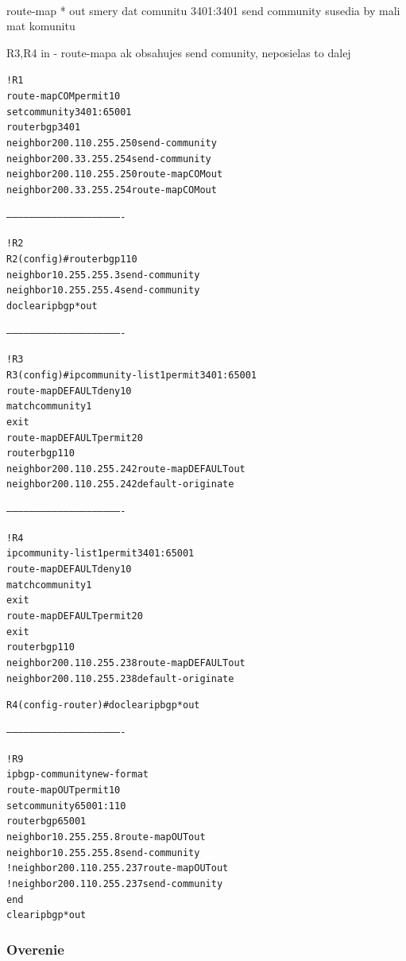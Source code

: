 \documentclass[12pt,twoside,a4paper]{report}
\begin{document}
\paragraph{}
route-map
* out smery dat comunitu 3401:3401
send community
susedia by mali mat komunitu

R3,R4 in - route-mapa
ak obsahujes send comunity, neposielas to dalej

\noindent
{\selectfont
\begin{small}
\begin{alltt}
!R1
route-map COM permit 10
  set community 3401:65001
router bgp 3401
neighbor 200.110.255.250 send-community
neighbor 200.33.255.254 send-community
  neighbor 200.110.255.250 route-map COM out
  neighbor 200.33.255.254 route-map COM out


-------------------------------------------------------------


!R2
R2(config)#router bgp 110
  neighbor 10.255.255.3 send-community
  neighbor 10.255.255.4 send-community
do clear ip bgp * out


-------------------------------------------------------------


!R3
R3(config)#ip community-list 1 permit 3401:65001
route-map DEFAULT deny 10
  match community 1
  exit
route-map DEFAULT permit 20
router bgp 110
  neighbor 200.110.255.242 route-map DEFAULT out
  neighbor 200.110.255.242 default-originate


-------------------------------------------------------------


!R4
ip community-list 1 permit 3401:65001
route-map DEFAULT deny 10
  match community 1
  exit
route-map DEFAULT permit 20
exit
router bgp 110
  neighbor 200.110.255.238 route-map DEFAULT out
  neighbor 200.110.255.238 default-originate

R4(config-router)#do clear ip bgp * out


-------------------------------------------------------------


!R9
ip bgp-community new-format
route-map OUT permit 10
set community 65001:110
router bgp 65001
neighbor 10.255.255.8 route-map OUT out
neighbor 10.255.255.8 send-community
!neighbor 200.110.255.237 route-map OUT out
!neighbor 200.110.255.237 send-community
end
clear ip bgp * out

\end{alltt}
\end{small}
}


\subsubsection{Overenie}
\end{document}
